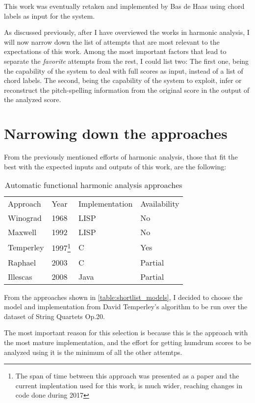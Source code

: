 This work was eventually retaken and implemented by Bas de
Haas \cite{de2013automatic} using chord labels as input for
the system.

As discussed previously, after I have overviewed the works
in harmonic analysis, I will now narrow down the list of
attempts that are most relevant to the expectations of this
work. Among the most important factors that lead to separate
the \emph{favorite} attempts from the rest, I could list
two: The first one, being the capability of the system to
deal with full scores as input, instead of a list of chord
labels. The second, being the capability of the system to
exploit, infer or reconstruct the pitch-spelling information
from the original score in the output of the analyzed score.

\section{Narrowing down the approaches} From the previously
mentioned efforts of harmonic analysis, those that fit the
best with the expected inputs and outputs of this work, are
the following: \begin{table}[tbp] \centering
\begin{tabular}{llll} Approach & Year & Implementation &
Availability \\
    Winograd & 1968 & LISP & No \\
    Maxwell & 1992 & LISP & No \\
    Temperley & 1997\footnote{The span of time between this
    approach was presented as a paper and the current
    implentation used for this work, is much wider, reaching
    changes in code done during 2017} & C & Yes \\
    Raphael & 2003 & C & Partial \\
    Illescas & 2008 & Java & Partial \end{tabular}
\caption{Automatic functional harmonic analysis approaches}
\label{table:shortlist_models} \end{table}

From the approaches shown in
\autoref{table:shortlist_models}, I decided to choose the
model and implementation from David Temperley's algorithm to
be run over the dataset of String Quartets Op.20.

The most important reason for this selection is because this
is the approach with the most mature implementation, and the
effort for getting humdrum scores to be analyzed using it is
the minimum of all the other attemtps.


